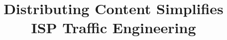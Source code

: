 \documentclass{sig-alternate}
\title{Distributing Content Simplifies ISP Traffic Engineering}
\begin{document}
\maketitle











\begin{scriptsize}
\end{scriptsize}


\end{document}
